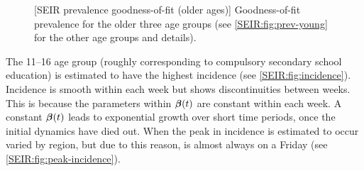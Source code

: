 \documentclass[thesis.tex]{subfiles}
\begin{document}
\begin{figure}
    \vspace{-3cm}
    \captionsetup{width=0.8\paperwidth}
    [SEIR prevalence goodness-of-fit (older ages)]{%
        Goodness-of-fit prevalence for the older three age groups (see \cref{SEIR:fig:prev-young} for the other age groups and details).
    }
    \label{SEIR:fig:prev-old}
\end{figure}

The 11--16 age group (roughly corresponding to compulsory secondary school education) is estimated to have the highest incidence (see \cref{SEIR:fig:incidence}).
Incidence is smooth within each week but shows discontinuities between weeks.
This is because the parameters within $\bm{\beta}(t)$ are constant within each week.
A constant $\bm{\beta}(t)$ leads to exponential growth over short time periods, once the initial dynamics have died out.
When the peak in incidence is estimated to occur varied by region, but due to this reason, is almost always on a Friday (see \cref{SEIR:fig:peak-incidence}).
\end{document}
